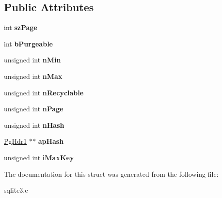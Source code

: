 \subsection*{Public Attributes}
\begin{DoxyCompactItemize}
\item 
\hypertarget{struct_p_cache1_a1425039a858b7518c097d8ae92597de0}{int {\bfseries sz\-Page}}\label{struct_p_cache1_a1425039a858b7518c097d8ae92597de0}

\item 
\hypertarget{struct_p_cache1_a2af7d24e27369252addec9bef45afcfc}{int {\bfseries b\-Purgeable}}\label{struct_p_cache1_a2af7d24e27369252addec9bef45afcfc}

\item 
\hypertarget{struct_p_cache1_a9e96c79ec60c2e368f92a2ba52d01c44}{unsigned int {\bfseries n\-Min}}\label{struct_p_cache1_a9e96c79ec60c2e368f92a2ba52d01c44}

\item 
\hypertarget{struct_p_cache1_aef08139a0b86b0c0a7ee2bec0bab2405}{unsigned int {\bfseries n\-Max}}\label{struct_p_cache1_aef08139a0b86b0c0a7ee2bec0bab2405}

\item 
\hypertarget{struct_p_cache1_a3501394bd251f08d1f9d26d3b2d4c67c}{unsigned int {\bfseries n\-Recyclable}}\label{struct_p_cache1_a3501394bd251f08d1f9d26d3b2d4c67c}

\item 
\hypertarget{struct_p_cache1_ace332c276e28352992529f60f0ac457c}{unsigned int {\bfseries n\-Page}}\label{struct_p_cache1_ace332c276e28352992529f60f0ac457c}

\item 
\hypertarget{struct_p_cache1_a09d9488a8a3a52822e33dd43e14c69e1}{unsigned int {\bfseries n\-Hash}}\label{struct_p_cache1_a09d9488a8a3a52822e33dd43e14c69e1}

\item 
\hypertarget{struct_p_cache1_a1169ec7ba2a628d89841d16ced651e1f}{\hyperlink{struct_pg_hdr1}{Pg\-Hdr1} $\ast$$\ast$ {\bfseries ap\-Hash}}\label{struct_p_cache1_a1169ec7ba2a628d89841d16ced651e1f}

\item 
\hypertarget{struct_p_cache1_a2dff616ad2d1873ad3a8d20d53bcb4d0}{unsigned int {\bfseries i\-Max\-Key}}\label{struct_p_cache1_a2dff616ad2d1873ad3a8d20d53bcb4d0}

\end{DoxyCompactItemize}


The documentation for this struct was generated from the following file\-:\begin{DoxyCompactItemize}
\item 
sqlite3.\-c\end{DoxyCompactItemize}
